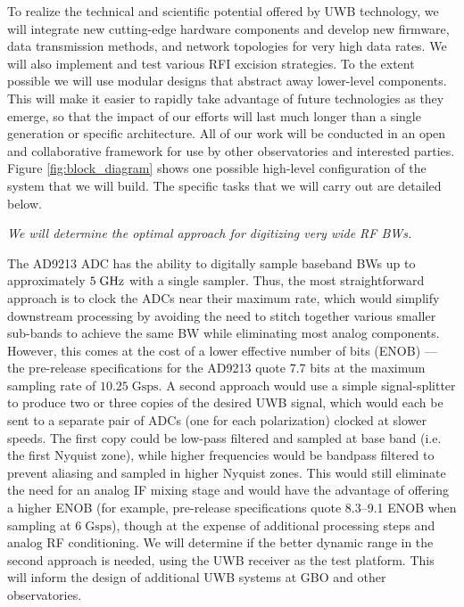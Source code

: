 \documentclass[10pt]{myNSF}
\begin{document}
To realize the technical and scientific potential offered by UWB
technology, we will integrate new cutting-edge hardware components and
develop new firmware, data transmission methods, and network
topologies for very high data rates.  We will also implement and test
various RFI excision strategies.  To the extent possible we will use
modular designs that abstract away lower-level components.  This will
make it easier to rapidly take advantage of future technologies as
they emerge, so that the impact of our efforts will last much longer
than a single generation or specific architecture.  All of our work
will be conducted in an open and collaborative framework for use by
other observatories and interested parties.  Figure
\ref{fig:block_diagram} shows one possible high-level configuration of
the system that we will build.  The specific tasks that we will carry
out are detailed below.

\newpage
{}
\label{sec:adc_fpga}

\emph{We will determine the optimal approach for digitizing very wide
  RF BWs.}

The AD9213 ADC has the ability to digitally sample baseband BWs up to
approximately $5\; \textrm{GHz}$ with a single sampler.  Thus, the most
straightforward approach is to clock the ADCs near their maximum rate,
which would simplify downstream processing by avoiding the need to
stitch together various smaller sub-bands to achieve the same BW while
eliminating most analog components.  However, this comes at the cost
of a lower effective number of bits (ENOB) --- the pre-release
specifications for the AD9213 quote 7.7 bits at the maximum sampling
rate of $10.25\; \mathrm{Gsps}$.  A second approach would use a simple
signal-splitter to produce two or three copies of the desired UWB
signal, which would each be sent to a separate pair of ADCs (one for
each polarization) clocked at slower speeds.  The first copy could be
low-pass filtered and sampled at base band (i.e. the first Nyquist
zone), while higher frequencies would be bandpass filtered to prevent
aliasing and sampled in higher Nyquist zones.  This would still
eliminate the need for an analog IF mixing stage and would have the
advantage of offering a higher ENOB (for example, pre-release
specifications quote 8.3--9.1 ENOB when sampling at $6\;
\mathrm{Gsps}$), though at the expense of additional processing steps
and analog RF conditioning.  We will determine if the better dynamic
range in the second approach is needed, using the UWB receiver as the
test platform.  This will inform the design of additional UWB systems
at GBO and other observatories.
\end{document}
